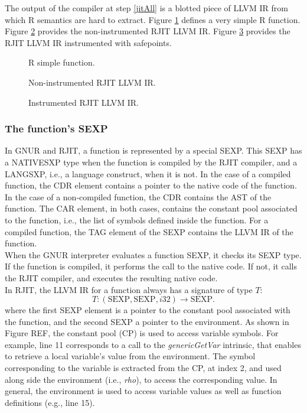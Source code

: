 The output of the compiler at step \ref{jitAll} is a blotted piece of LLVM IR from which R semantics are hard to extract.
Figure \ref{fig:RSimpleFunction} defines a very simple R function.
Figure \ref{fig:noninstrumentedir} provides the non-instrumented RJIT LLVM IR.
Figure \ref{fig:instrumentedir} provides the RJIT LLVM IR instrumented with safepoints.\\

\begin{figure}[h]
        \caption{R simple function.}
        \label{fig:RSimpleFunction}
\end{figure}

\begin{figure}[h]
    \caption{Non-instrumented RJIT LLVM IR.}
    \label{fig:noninstrumentedir}
\end{figure}

\clearpage
\begin{figure}
    \caption{Instrumented RJIT LLVM IR.}
\label{fig:instrumentedir}
\end{figure}
\clearpage


\subsubsection{The function's SEXP}
In GNUR and RJIT, a function is represented by a special SEXP. 
This SEXP has a NATIVESXP type when the function is compiled by the RJIT compiler, and a LANGSXP, i.e., a language construct, when it is not.
In the case of a compiled function, the CDR element contains a pointer to the native code of the function.
In the case of a non-compiled function, the CDR contains the AST of the function.
The CAR element, in both cases, contains the constant pool associated to the function, i.e., the list of symbols defined inside the function.
For a compiled function, the TAG element of the SEXP contains the LLVM IR of the function.\\

When the GNUR interpreter evaluates a function SEXP, it checks its SEXP type. 
If the function is compiled, it performs the call to the native code. 
If not, it calls the RJIT compiler, and executes the resulting native code.\\

In RJIT, the LLVM IR for a function always has a signature of type $T$:
$$T: (\text{SEXP}, \text{SEXP}, i32) \rightarrow \text{SEXP}.$$
where the first SEXP element is a pointer to the constant pool associated with the function, and the second SEXP a pointer to the environment.
As shown in Figure REF, the constant pool (CP) is used to access variable symbols. 
For example, line 11 corresponds to a call to the \textit{genericGetVar} intrinsic, that enables to retrieve a local variable's value from the environment.
The symbol corresponding to the variable is extracted from the CP, at index 2, and used along side the environment (i.e., \textit{rho}), to access the corresponding value.
In general, the environment is used to access variable values as well as function definitions (e.g., line 15).\\


